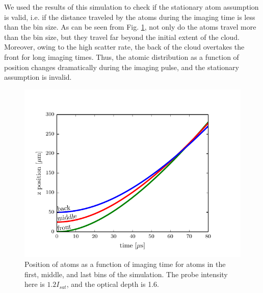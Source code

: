 \documentclass[12pt]{iopart}
\begin{document}
\par We used the results of this simulation to check if the stationary atom assumption is valid, i.e. if the distance traveled by the atoms during the imaging time is less than the bin size. As can be seen from Fig. \ref{fig:atomTravel}, not only do the atoms travel more than the bin size, but they travel far beyond the initial extent of the cloud. Moreover, owing to the high scatter rate, the back of the cloud overtakes the front for long imaging times. Thus, the atomic distribution as a function of position changes dramatically during the imaging pulse, and the stationary assumption is invalid. 
\begin{figure}
	\includegraphics{figure4.pdf}
\caption{Position of atoms as a function of imaging time for atoms in the first, middle, and last bins of the simulation. The probe intensity here is $1.2 I_{sat}$, and the optical depth is 1.6.}  
\label{fig:atomTravel}
\end{figure}
\end{document}
